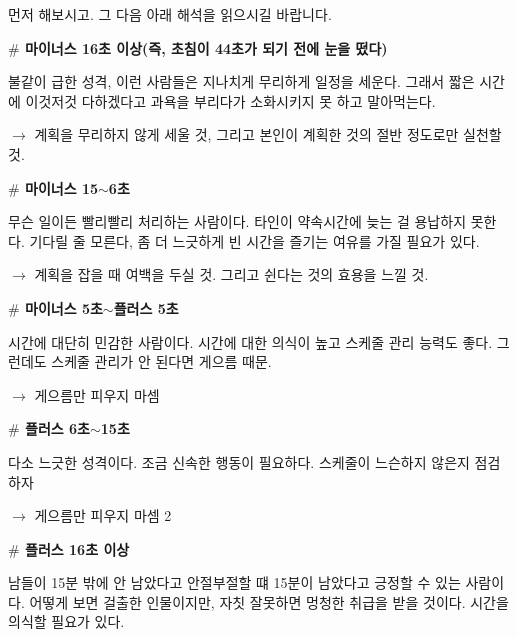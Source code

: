 먼저 해보시고. 그 다음 아래 해석을 읽으시길 바랍니다.
\vspace{5mm}

\textbf{$\#$ 마이너스 16초 이상(즉, 초침이 44초가 되기 전에 눈을 떴다)}
\vspace{5mm}

불같이 급한 성격, 이런 사람들은 지나치게 무리하게 일정을 세운다.
그래서 짧은 시간에 이것저것 다하겠다고 과욕을 부리다가 소화시키지 못 하고 말아먹는다.
\vspace{5mm}

$\rightarrow$ 계획을 무리하지 않게 세울 것, 그리고 본인이 계획한 것의 절반 정도로만 실천할 것.
\vspace{5mm}

\textbf{$\#$ 마이너스 15$\sim$6초}
\vspace{5mm}

무슨 일이든 빨리빨리 처리하는 사람이다. 타인이 약속시간에 늦는 걸 용납하지 못한다.
기다릴 줄 모른다, 좀 더 느긋하게 빈 시간을 즐기는 여유를 가질 필요가 있다.
\vspace{5mm}

$\rightarrow$ 계획을 잡을 때 여백을 두실 것. 그리고 쉰다는 것의 효용을 느낄 것.
\vspace{5mm}

\textbf{$\#$ 마이너스 5초$\sim$플러스 5초}
\vspace{5mm}

시간에 대단히 민감한 사람이다. 시간에 대한 의식이 높고 스케줄 관리 능력도 좋다.
그런데도 스케줄 관리가 안 된다면 게으름 때문.
\vspace{5mm}

$\rightarrow$ 게으름만 피우지 마셈
\vspace{5mm}

\textbf{$\#$ 플러스 6초$\sim$15초}
\vspace{5mm}

다소 느긋한 성격이다. 조금 신속한 행동이 필요하다. 스케줄이 느슨하지 않은지 점검하자
\vspace{5mm}

$\rightarrow$ 게으름만 피우지 마셈 2
\vspace{5mm}

\textbf{$\#$ 플러스 16초 이상}
\vspace{5mm}

남들이 15분 밖에 안 남았다고 안절부절할 떄 15분이 남았다고 긍정할 수 있는 사람이다.
어떻게 보면 걸출한 인물이지만, 자칫 잘못하면 멍청한 취급을 받을 것이다.
시간을 의식할 필요가 있다.
\vspace{5mm}

